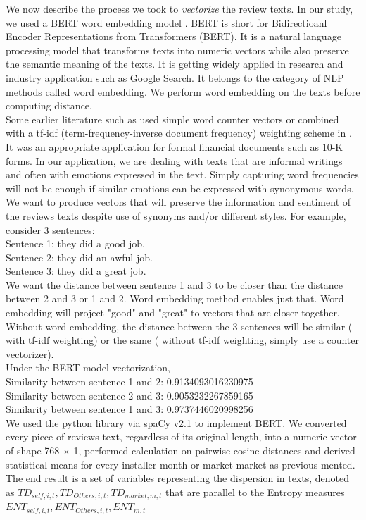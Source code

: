 \documentclass[msom,blindrev]{informs3}
\begin{document}
We now describe the process we took to \textit{vectorize} the review texts. In our study, we used a BERT word embedding model \citep{devlin2018bert}. BERT is short for Bidirectioanl Encoder Representations from Transformers (BERT). It is a natural language processing model that transforms texts into numeric vectors while also preserve the semantic meaning of the texts. It is getting widely applied in research and industry application such as Google Search. It belongs to the category of NLP methods called word embedding. We perform word embedding on the texts before computing distance. \\
Some earlier literature such as \cite{hoberg2016text} used simple word counter vectors or combined with a tf-idf (term-frequency-inverse document frequency) weighting scheme in \cite{loughran2011liability}. It was an appropriate application for formal financial documents such as 10-K forms. In our application, we are dealing with texts that are informal writings and often with emotions expressed in the text. Simply capturing word frequencies will not be enough if similar emotions can be expressed with synonymous words. We want to produce vectors that will preserve the information and sentiment of the reviews texts despite use of synonyms and/or different styles. For example, consider 3 sentences: \\
Sentence 1: they did a good job. \\
Sentence 2: they did an awful job. \\
Sentence 3: they did a great job. \\
We want the distance between sentence 1 and 3 to be closer than the distance between 2 and 3 or 1 and 2. Word embedding method enables just that. Word embedding will project "good" and "great" to vectors that are closer together. Without word embedding, the distance between the 3 sentences will be similar ( with tf-idf weighting) or the same ( without tf-idf weighting, simply use a counter vectorizer). \\
Under the BERT model vectorization, \\
Similarity between sentence 1 and 2: 0.9134093016230975\\
Similarity between sentence 2 and 3: 0.9053232267859165\\
Similarity between sentence 1 and 3: 0.9737446020998256\\

We used the python library via spaCy v2.1 to implement BERT. We converted every piece of reviews text, regardless of its original length, into a numeric vector of shape 768 $\times$ 1,  performed calculation on pairwise cosine distances and derived statistical means for every installer-month or market-market as previous mented. The end result is a set of variables representing the dispersion in texts, denoted as $TD_{self,i,t},TD_{Others,i,t},TD_{market,m,t}$ that are parallel to the Entropy measures $ENT_{self,i,t},ENT_{Others,i,t},ENT_{m,t}$ \\
\end{document}
